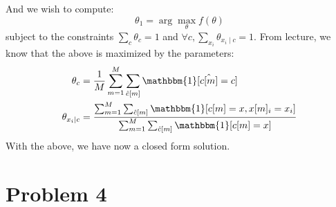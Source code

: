 \documentclass[12pt]{article}
\begin{document}
\begin{enumerate}[label=(\alph*)]
	And we wish to compute:
	$$
		\theta_1 = \arg\max_{\theta} f(\theta)
	$$
	subject to the constraints $\sum_{c} \theta_c = 1$ and $\forall c, \sum_{x_i} \theta_{x_i \mid c} = 1$.
	From lecture, we know that the above is maximized by the parameters:
	\begin{align*}
		\theta_c &= 
		\frac{1}{M}\sum_{m=1}^M \sum_{\hat{c}[m]} \mathbbm{1}[\hat{c[m]} = c]
		\\
		\theta_{x_i \mid c} &= \frac{\sum_{m=1}^M \sum_{\hat{c}[m]} \mathbbm{1}[c[m] = x, x[m]_i = x_i] }{\sum_{m=1}^M \sum_{\hat{c}[m]} \mathbbm{1}[c[m] = x]}
	\end{align*}
	With the above, we have now a closed form solution.
\end{enumerate}

\section*{Problem 4}
\end{document}
